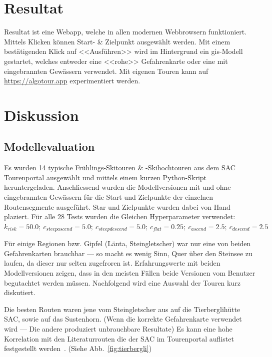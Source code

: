 \section{Resultat}

Resultat ist eine Webapp, welche in allen modernen Webbrowsern funktioniert. Mittels Klicken können Start- \& Zielpunkt ausgewählt werden. Mit einem bestätigenden Klick auf <<Ausführen>> wird im Hintergrund ein \gls{gis}-Modell gestartet, welches entweder eine <<rohe>> Gefahrenkarte oder eine mit eingebrannten Gewässern verwendet. Mit eigenen Touren kann auf \url{https://algotour.app} experimentiert werden.


\clearpage
\section{Diskussion}

\subsection{Modellevaluation}

Es wurden 14 typische Frühlings-Skitouren \& -Skihochtouren aus dem SAC Tourenportal ausgewählt und mittels einem kurzen Python-Skript heruntergeladen. Anschliessend wurden die Modellversionen mit und ohne eingebrannten Gewässern für die Start und Zielpunkte der einzelnen Routensegmente ausgeführt. Star und Zielpunkte wurden dabei von Hand plaziert. Für alle 28 Tests wurden die Gleichen Hyperparameter verwendet: $k_{risk}={50.0};\ c_{steepascend}={5.0};\ c_{steepdescend}={5.0};\ c_{flat}={0.25};\ c_{ascend}={2.5};\ c_{descend}={2.5}$

Für einige Regionen bzw. Gipfel (Länta, Steingletscher) war nur eine von beiden Gefahrenkarten brauchbar --- so macht es wenig Sinn, Quer über den Steinsee zu laufen, da dieser nur selten zugefroren ist. Erfahrungswerte mit beiden Modellversionen zeigen, dass in den meisten Fällen beide Versionen vom Benutzer begutachtet werden müssen.
Nachfolgend wird eine Auswahl der Touren kurz diskutiert.

Die besten Routen waren jene vom Steingletscher aus auf die Tierberglihütte SAC, sowie auf das Sustenhorn. (Wenn die korrekte Gefahrenkarte verwendet wird --- Die andere produziert unbrauchbare Resultate) Es kann eine hohe Korrelation mit den Literaturrouten die der SAC im Tourenportal auflistet festgestellt werden~\cite{mmzentralch}. (Siehe Abb.\ \ref{fig:tierbergli})

